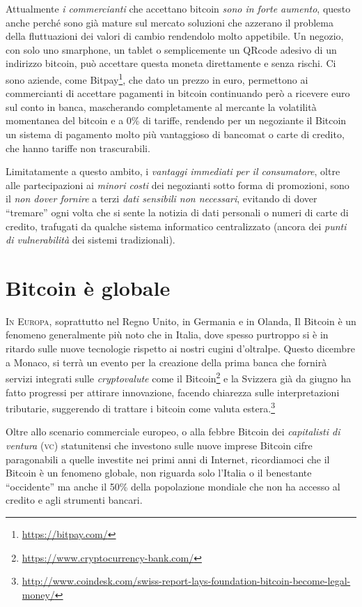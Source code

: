 \documentclass[a4paper,12pt,italian]{article}
\begin{document}
\bigskip

Attualmente \emph{i commercianti} che accettano bitcoin \emph{sono in forte aumento},
questo anche perché sono già mature sul mercato soluzioni che azzerano
il problema della fluttuazioni dei valori di cambio rendendolo molto
appetibile. Un negozio, con solo uno smarphone, un tablet o
semplicemente un QRcode adesivo di un indirizzo bitcoin, può accettare
questa moneta direttamente e senza rischi. Ci sono aziende, come
Bitpay\footnote{\url{https://bitpay.com/}}, che dato un prezzo in euro,
permettono ai commercianti di accettare pagamenti in bitcoin
continuando però a ricevere euro sul conto in banca, mascherando
completamente al mercante la volatilità momentanea del bitcoin e a 0\%
di tariffe, rendendo per un negoziante il Bitcoin un sistema di pagamento 
molto più vantaggioso di bancomat o carte di credito, che hanno tariffe non
trascurabili.

Limitatamente a questo ambito, i \emph{vantaggi immediati per il consumatore}, oltre alle partecipazioni ai \emph{minori costi}
dei negozianti sotto forma di promozioni, sono il \emph{non dover fornire} a terzi \emph{dati sensibili non 
necessari}, evitando di dover ``tremare'' ogni volta che si sente la notizia di dati personali o numeri di carte di credito, trafugati
da qualche sistema informatico centralizzato (ancora dei \emph{punti di vulnerabilità} dei sistemi tradizionali).


\section*{Bitcoin è globale}


\lettrine{I}{n Europa}, soprattutto nel Regno Unito, in Germania e in Olanda,
Il Bitcoin è un fenomeno generalmente più noto che in Italia, 
dove spesso purtroppo si è in ritardo sulle nuove tecnologie rispetto ai nostri cugini d'oltralpe.
Questo dicembre a Monaco, si terrà un evento per la creazione della prima banca che fornirà servizi integrati sulle
\emph{cryptovalute} come il Bitcoin\footnote{\url{https://www.cryptocurrency-bank.com/}} e la Svizzera  già da giugno ha fatto progressi per 
attirare innovazione, facendo chiarezza sulle interpretazioni tributarie, suggerendo di trattare
i bitcoin come valuta estera.\footnote{\url{http://www.coindesk.com/swiss-report-lays-foundation-bitcoin-become-legal-money/}}

Oltre allo scenario commerciale europeo, o alla febbre Bitcoin dei \emph{capitalisti di ventura} (\textsc{vc}) statunitensi che investono sulle nuove imprese Bitcoin cifre paragonabili
a quelle investite nei primi anni di Internet, ricordiamoci che il Bitcoin è un fenomeno globale, non riguarda solo l’Italia o il
benestante “occidente” ma anche il 50\% della popolazione mondiale che
non ha accesso al credito e agli strumenti bancari.
\end{document}
